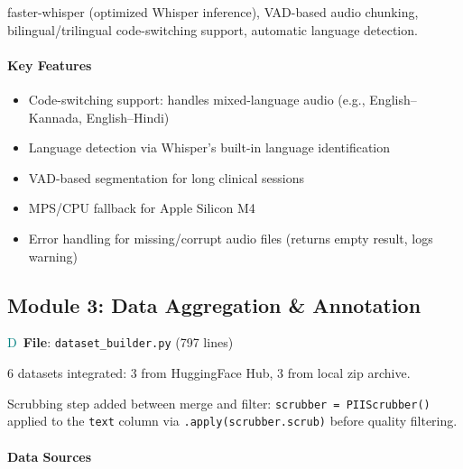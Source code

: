 \documentclass[11pt,a4paper]{article}
\begin{document}
\begin{tcolorbox}[infoBox={Technology Stack}]
faster-whisper (optimized Whisper inference), VAD-based audio chunking, bilingual/trilingual code-switching support, automatic language detection.
\end{tcolorbox}

\paragraph{Key Features}
\begin{itemize}[label=\textcolor{teal}{$\checkmark$}, leftmargin=*]
\item Code-switching support: handles mixed-language audio (e.g., English--Kannada, English--Hindi)
\item Language detection via Whisper's built-in language identification
\item VAD-based segmentation for long clinical sessions
\item MPS/CPU fallback for Apple Silicon M4
\item Error handling for missing/corrupt audio files (returns empty result, logs warning)
\end{itemize}

\subsection{Module 3: Data Aggregation \& Annotation}
\textcolor{teal}{\textsf{D}}\ \textbf{File}: \texttt{dataset\_builder.py} (797 lines)

\begin{tcolorbox}[infoBox={Data Sources}]
6 datasets integrated: 3 from HuggingFace Hub, 3 from local zip archive.
\end{tcolorbox}

\begin{tcolorbox}[warnBox={PII Scrubbing Integration}]
Scrubbing step added between merge and filter: \texttt{scrubber = PIIScrubber()} applied to the \texttt{text} column via \texttt{.apply(scrubber.scrub)} before quality filtering.
\end{tcolorbox}

\paragraph{Data Sources}
\end{document}
